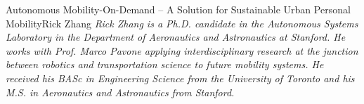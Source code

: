 \documentclass{papertex}
\begin{document}
\begin{news}{2}{Autonomous Mobility-On-Demand -- A Solution for Sustainable Urban Personal Mobility}{Rick Zhang}{}{}
\emph{Rick Zhang is a Ph.D. candidate in the Autonomous Systems Laboratory 
in the Department of Aeronautics and Astronautics at Stanford. He works with 
Prof. Marco Pavone applying interdisciplinary research at the junction between 
robotics and transportation science to future mobility systems. He received 
his BASc in Engineering Science from the University of Toronto and his M.S. 
in Aeronautics and Astronautics from Stanford.}

\end{news}
\end{document}
